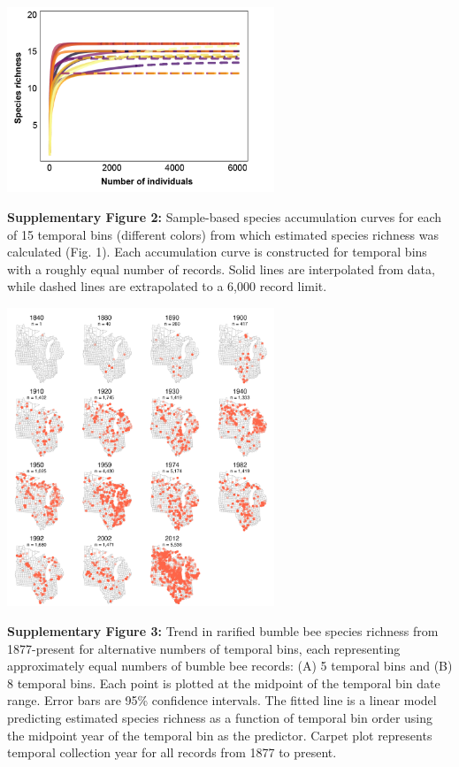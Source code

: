 \documentclass[11pt,]{article}
\begin{document}
\clearpage

\newpage

\includegraphics[width=0.6\textwidth,height=\textheight]{../ms_figs/fig_s3.png}

\textbf{Supplementary Figure 2:} Sample-based species accumulation
curves for each of 15 temporal bins (different colors) from which
estimated species richness was calculated (Fig. 1). Each accumulation
curve is constructed for temporal bins with a roughly equal number of
records. Solid lines are interpolated from data, while dashed lines are
extrapolated to a 6,000 record limit.

\clearpage

\newpage

\includegraphics[width=0.6\textwidth,height=\textheight]{../ms_figs/fig_s1.png}

\textbf{Supplementary Figure 3:} Trend in rarified bumble bee species
richness from 1877-present for alternative numbers of temporal bins,
each representing approximately equal numbers of bumble bee records: (A)
5 temporal bins and (B) 8 temporal bins. Each point is plotted at the
midpoint of the temporal bin date range. Error bars are 95\% confidence
intervals. The fitted line is a linear model predicting estimated
species richness as a function of temporal bin order using the midpoint
year of the temporal bin as the predictor. Carpet plot represents
temporal collection year for all records from 1877 to present.
\end{document}
